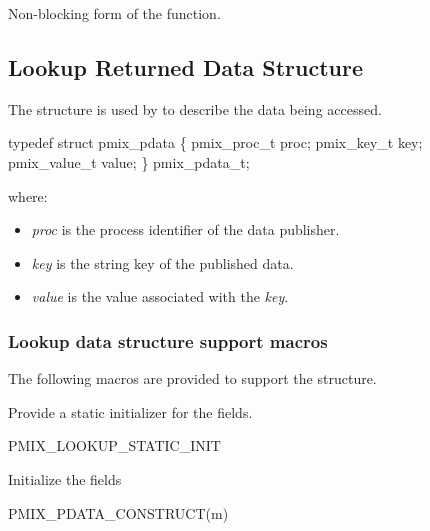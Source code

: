 \descr

Non-blocking form of the  function.


\subsection{Lookup Returned Data Structure}

The  structure is used by  to describe the data being accessed.

\cspecificstart
\begin{codepar}
typedef struct pmix_pdata \{
    pmix_proc_t proc;
    pmix_key_t key;
    pmix_value_t value;
\} pmix_pdata_t;
\end{codepar}
\cspecificend

where:
\begin{itemize}
    \item \emph{proc} is the process identifier of the data publisher.
    \item \emph{key} is the string key of the published data.
    \item \emph{value} is the value associated with the \emph{key}.
\end{itemize}


\subsubsection{Lookup data structure support macros}

The following macros are provided to support the  structure.


Provide a static initializer for the  fields.

\cspecificstart
\begin{codepar}
PMIX_LOOKUP_STATIC_INIT
\end{codepar}
\cspecificend



Initialize the  fields

\cspecificstart
\begin{codepar}
PMIX_PDATA_CONSTRUCT(m)
\end{codepar}
\cspecificend

